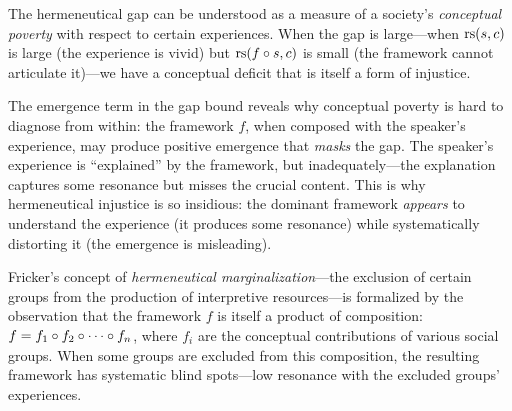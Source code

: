 \begin{remark}
The hermeneutical gap can be understood as a measure of a society's
\emph{conceptual poverty} with respect to certain experiences. When the gap is
large---when $\mathrm{rs}(s, c)$ is large (the experience is vivid) but $\mathrm{rs}(f \circ
s, c)$ is small (the framework cannot articulate it)---we have a conceptual
deficit that is itself a form of injustice.

The emergence term in the gap bound reveals why conceptual poverty is hard to
diagnose from within: the framework $f$, when composed with the speaker's
experience, may produce positive emergence that \emph{masks} the gap. The
speaker's experience is ``explained'' by the framework, but inadequately---the
explanation captures some resonance but misses the crucial content. This is why
hermeneutical injustice is so insidious: the dominant framework \emph{appears}
to understand the experience (it produces some resonance) while systematically
distorting it (the emergence is misleading).

Fricker's concept of \emph{hermeneutical marginalization}---the exclusion of
certain groups from the production of interpretive resources---is formalized by
the observation that the framework $f$ is itself a product of composition: $f =
f_1 \circ f_2 \circ \cdots \circ f_n$, where $f_i$ are the conceptual
contributions of various social groups. When some groups are excluded from this
composition, the resulting framework has systematic blind spots---low resonance
with the excluded groups' experiences.
\end{remark}

